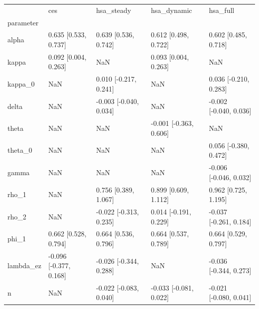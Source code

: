 \begin{tabular}{lllll}
\toprule
 & ces & hsa\_steady & hsa\_dynamic & hsa\_full \\
parameter &  &  &  &  \\
\midrule
alpha & 0.635 [0.533, 0.737] & 0.639 [0.536, 0.742] & 0.612 [0.498, 0.722] & 0.602 [0.485, 0.718] \\
kappa & 0.092 [0.004, 0.263] & NaN & 0.093 [0.004, 0.263] & NaN \\
kappa\_0 & NaN & 0.010 [-0.217, 0.241] & NaN & 0.036 [-0.210, 0.283] \\
delta & NaN & -0.003 [-0.040, 0.034] & NaN & -0.002 [-0.040, 0.036] \\
theta & NaN & NaN & -0.001 [-0.363, 0.606] & NaN \\
theta\_0 & NaN & NaN & NaN & 0.056 [-0.380, 0.472] \\
gamma & NaN & NaN & NaN & -0.006 [-0.046, 0.032] \\
rho\_1 & NaN & 0.756 [0.389, 1.067] & 0.899 [0.609, 1.112] & 0.962 [0.725, 1.195] \\
rho\_2 & NaN & -0.022 [-0.313, 0.235] & 0.014 [-0.191, 0.229] & -0.037 [-0.261, 0.184] \\
phi\_1 & 0.662 [0.528, 0.794] & 0.664 [0.536, 0.796] & 0.664 [0.537, 0.789] & 0.664 [0.529, 0.797] \\
lambda\_ez & -0.096 [-0.377, 0.168] & -0.026 [-0.344, 0.288] & NaN & -0.036 [-0.344, 0.273] \\
n & NaN & -0.022 [-0.083, 0.040] & -0.033 [-0.081, 0.022] & -0.021 [-0.080, 0.041] \\
\bottomrule
\end{tabular}
